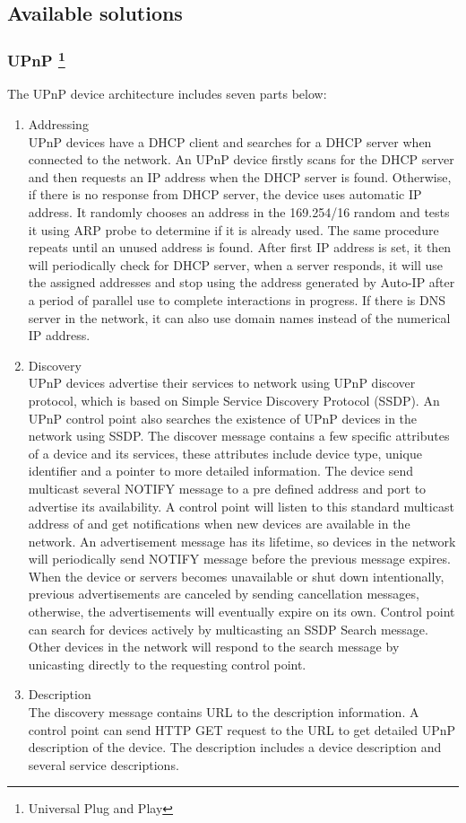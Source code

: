 \subsection{Available solutions}
\subsubsection[UPnP]{UPnP \footnote{Universal Plug and Play}}
The UPnP device architecture \cite{upnp} \label{upnp} includes seven parts
below:

\begin{enumerate}
\item Addressing \\
UPnP devices have a DHCP client and searches for a DHCP server when connected to the network. 
An UPnP device firstly scans for the DHCP server and then requests an IP address when the DHCP 
server is found. Otherwise, if there is no response from DHCP server, the device uses automatic 
IP address. It randomly chooses an address in the 169.254/16 random and tests it using ARP probe 
to determine if it is already used. The same procedure repeats until an unused address is found. 
After first IP address is set, it then will periodically check for DHCP server, when a server 
responds, it will use the assigned addresses and stop using the address generated by Auto-IP 
after a period of parallel use to complete interactions in progress.
If there is DNS server in the network, it can also use domain names instead of the numerical IP address.
\item Discovery \\
UPnP devices advertise their services to network using UPnP discover protocol, which is based on 
Simple Service Discovery Protocol (SSDP). An UPnP control point also searches the existence of 
UPnP devices in the network using SSDP. The discover message contains a few specific attributes 
of a device and its services, these attributes include device type, unique identifier and a 
pointer to more detailed information.
The device send multicast several NOTIFY message to a pre defined address and port to advertise 
its availability. A control point will listen to this standard multicast address of and get 
notifications when new devices are available in the network.
An advertisement message has its lifetime, so devices in the network will periodically send 
NOTIFY message before the previous message expires. When the device or servers becomes unavailable 
or shut down intentionally, previous advertisements are canceled by sending cancellation messages, 
otherwise, the advertisements will eventually expire on its own.
Control point can search for devices actively by multicasting an SSDP Search message. Other devices 
in the network will respond to the search message by unicasting directly to the requesting control point.
\item Description \\
The discovery message contains URL to the description information. A control point can send HTTP 
GET request to the URL to get detailed UPnP description of the device. The description includes 
a device description and several service descriptions. 


\end{enumerate}
